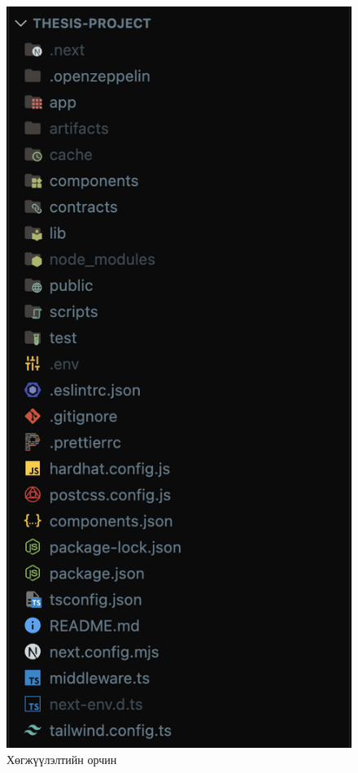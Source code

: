 \begin{figure}[htbp]
\begin{minipage}[ht]{0.4\textwidth}
       \includegraphics[scale=0.27]{src/images/folder-structure.png}
       \caption{Хөгжүүлэлтийн орчин}
   \end{minipage}
   \begin{minipage}[h!t]{0.5\textwidth}

\end{minipage}
\end{figure}
